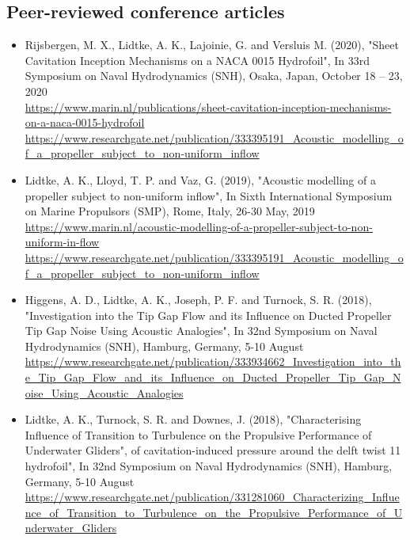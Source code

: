 \documentclass[a4paper,10pt]{article}
\begin{document}
\subsection{Peer-reviewed conference articles}
%
\begin{itemize}
\item Rijsbergen, M. X., Lidtke, A. K., Lajoinie, G. and Versluis M. (2020),
	"Sheet Cavitation Inception Mechanisms on a NACA 0015 Hydrofoil",
	In 33rd Symposium on Naval Hydrodynamics (SNH), Osaka, Japan, October 18 – 23, 2020
	\cite{Rijsbergen2020}
	\\ \url{https://www.marin.nl/publications/sheet-cavitation-inception-mechanisms-on-a-naca-0015-hydrofoil}
	\\ \url{https://www.researchgate.net/publication/333395191\_Acoustic\_modelling\_of\_a\_propeller\_subject\_to\_non-uniform\_inflow}
%
\item Lidtke, A. K., Lloyd, T. P. and Vaz, G. (2019),
	"Acoustic modelling of a propeller subject to non-uniform inflow",
	In Sixth International Symposium on Marine Propulsors (SMP), Rome, Italy, 26-30 May, 2019
	\cite{Lidtke2019a}
	\\ \url{https://www.marin.nl/acoustic-modelling-of-a-propeller-subject-to-non-uniform-in-flow}
	\\ \url{https://www.researchgate.net/publication/333395191\_Acoustic\_modelling\_of\_a\_propeller\_subject\_to\_non-uniform\_inflow}
%
\item Higgens, A. D., Lidtke, A. K., Joseph, P. F. and Turnock, S. R. (2018),
	"Investigation into the Tip Gap Flow and its Influence on Ducted Propeller Tip Gap Noise Using Acoustic Analogies",
	In 32nd Symposium on Naval Hydrodynamics (SNH), Hamburg, Germany, 5-10 August
	\cite{Higgens2018}
	\\ \url{https://www.researchgate.net/publication/333934662\_Investigation\_into\_the\_Tip\_Gap\_Flow\_and\_its\_Influence\_on\_Ducted\_Propeller\_Tip\_Gap\_Noise\_Using\_Acoustic\_Analogies}
%
\item Lidtke, A. K., Turnock, S. R. and Downes, J. (2018),
	"Characterising Influence of Transition to Turbulence on the Propulsive Performance of Underwater Gliders",
	of cavitation-induced pressure around the delft twist 11 hydrofoil",
	In 32nd Symposium on Naval Hydrodynamics (SNH), Hamburg, Germany, 5-10 August
	\cite{Lidtke2018}
	\\ \url{https://www.researchgate.net/publication/331281060_Characterizing_Influence_of_Transition_to_Turbulence_on_the_Propulsive_Performance_of_Underwater_Gliders}

\end{itemize}
\end{document}
